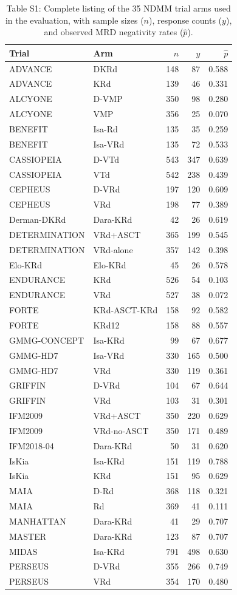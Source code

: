 \documentclass[12pt]{article}
\begin{document}
\begin{table}[h]
\centering
\caption*{Table S1: Complete listing of the 35 NDMM trial arms used in the evaluation, with sample sizes ($n$), response counts ($y$), and observed MRD negativity rates ($\hat{p}$).}
\begin{tabular}{llrrr}
\toprule
Trial & Arm & $n$ & $y$ & $\hat{p}$ \\
\midrule
ADVANCE & DKRd & 148 & 87 & 0.588 \\
ADVANCE & KRd & 139 & 46 & 0.331 \\
ALCYONE & D-VMP & 350 & 98 & 0.280 \\
ALCYONE & VMP & 356 & 25 & 0.070 \\
BENEFIT & Isa-Rd & 135 & 35 & 0.259 \\
BENEFIT & Isa-VRd & 135 & 72 & 0.533 \\
CASSIOPEIA & D-VTd & 543 & 347 & 0.639 \\
CASSIOPEIA & VTd & 542 & 238 & 0.439 \\
CEPHEUS & D-VRd & 197 & 120 & 0.609 \\
CEPHEUS & VRd & 198 & 77 & 0.389 \\
Derman-DKRd & Dara-KRd & 42 & 26 & 0.619 \\
DETERMINATION & VRd+ASCT & 365 & 199 & 0.545 \\
DETERMINATION & VRd-alone & 357 & 142 & 0.398 \\
Elo-KRd & Elo-KRd & 45 & 26 & 0.578 \\
ENDURANCE & KRd & 526 & 54 & 0.103 \\
ENDURANCE & VRd & 527 & 38 & 0.072 \\
FORTE & KRd-ASCT-KRd & 158 & 92 & 0.582 \\
FORTE & KRd12 & 158 & 88 & 0.557 \\
GMMG-CONCEPT & Isa-KRd & 99 & 67 & 0.677 \\
GMMG-HD7 & Isa-VRd & 330 & 165 & 0.500 \\
GMMG-HD7 & VRd & 330 & 119 & 0.361 \\
GRIFFIN & D-VRd & 104 & 67 & 0.644 \\
GRIFFIN & VRd & 103 & 31 & 0.301 \\
IFM2009 & VRd+ASCT & 350 & 220 & 0.629 \\
IFM2009 & VRd-no-ASCT & 350 & 171 & 0.489 \\
IFM2018-04 & Dara-KRd & 50 & 31 & 0.620 \\
IsKia & Isa-KRd & 151 & 119 & 0.788 \\
IsKia & KRd & 151 & 95 & 0.629 \\
MAIA & D-Rd & 368 & 118 & 0.321 \\
MAIA & Rd & 369 & 41 & 0.111 \\
MANHATTAN & Dara-KRd & 41 & 29 & 0.707 \\
MASTER & Dara-KRd & 123 & 87 & 0.707 \\
MIDAS & Isa-KRd & 791 & 498 & 0.630 \\
PERSEUS & D-VRd & 355 & 266 & 0.749 \\
PERSEUS & VRd & 354 & 170 & 0.480 \\
\bottomrule
\end{tabular}
\end{table}
\end{document}
